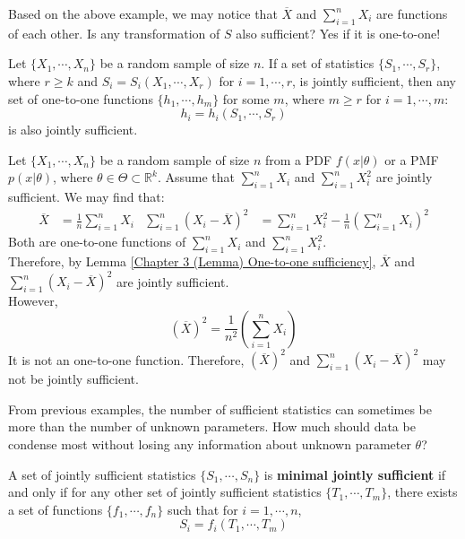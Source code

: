 \documentclass{huhtakm-template-book-v2}
\begin{document}
\newpage
Based on the above example, we may notice that $\overline{X}$ and $\sum_{i=1}^{n}X_{i}$ are functions of each other. Is any transformation of $S$ also sufficient? Yes if it is one-to-one!
\begin{lem}
	\label{Chapter 3 (Lemma) One-to-one sufficiency}
	Let $\{X_{1},\cdots,X_{n}\}$ be a random sample of size $n$. If a set of statistics $\{S_{1},\cdots,S_{r}\}$, where $r\geq k$ and $S_{i}=S_{i}(X_{1},\cdots,X_{r})$ for $i=1,\cdots,r$, is jointly sufficient, then any set of one-to-one functions $\{h_{1},\cdots,h_{m}\}$ for some $m$, where $m\geq r$ for $i=1,\cdots,m$:
	\begin{equation*}
		h_{i}=h_{i}(S_{1},\cdots,S_{r})
	\end{equation*}
	is also jointly sufficient.
\end{lem}
\begin{eg}
	Let $\{X_{1},\cdots,X_{n}\}$ be a random sample of size $n$ from a PDF $f(x|\theta)$ or a PMF $p(x|\theta)$, where $\theta\in\Theta\subset\mathbb{R}^{k}$. Assume that $\sum_{i=1}^{n}X_{i}$ and $\sum_{i=1}^{n}X_{i}^{2}$ are jointly sufficient. We may find that:
	\begin{align*}
		\overline{X}&=\frac{1}{n}\sum_{i=1}^{n}X_{i} & \sum_{i=1}^{n}(X_{i}-\overline{X})^{2}&=\sum_{i=1}^{n}X_{i}^{2}-\frac{1}{n}\left(\sum_{i=1}^{n}X_{i}\right)^{2}
	\end{align*}
	Both are one-to-one functions of $\sum_{i=1}^{n}X_{i}$ and $\sum_{i=1}^{n}X_{i}^{2}$.\\
	Therefore, by Lemma \ref{Chapter 3 (Lemma) One-to-one sufficiency}, $\overline{X}$ and $\sum_{i=1}^{n}(X_{i}-\overline{X})^{2}$ are jointly sufficient.\\
	However,
	\begin{equation*}
		(\overline{X})^{2}=\frac{1}{n^{2}}\left(\sum_{i=1}^{n}X_{i}\right)
	\end{equation*}
	It is not an one-to-one function. Therefore, $(\overline{X})^{2}$ and $\sum_{i=1}^{n}(X_{i}-\overline{X})^{2}$ may not be jointly sufficient.
\end{eg}
From previous examples, the number of sufficient statistics can sometimes be more than the number of unknown parameters. How much should data be condense most without losing any information about unknown parameter $\theta$?
\begin{defn}
	A set of jointly sufficient statistics $\{S_{1},\cdots,S_{n}\}$ is \textbf{minimal jointly sufficient} if and only if for any other set of jointly sufficient statistics $\{T_{1},\cdots,T_{m}\}$, there exists a set of functions $\{f_{1},\cdots,f_{n}\}$ such that for $i=1,\cdots,n$,
	\begin{equation*}
		S_{i}=f_{i}(T_{1},\cdots,T_{m})
	\end{equation*}
\end{defn}
\end{document}
